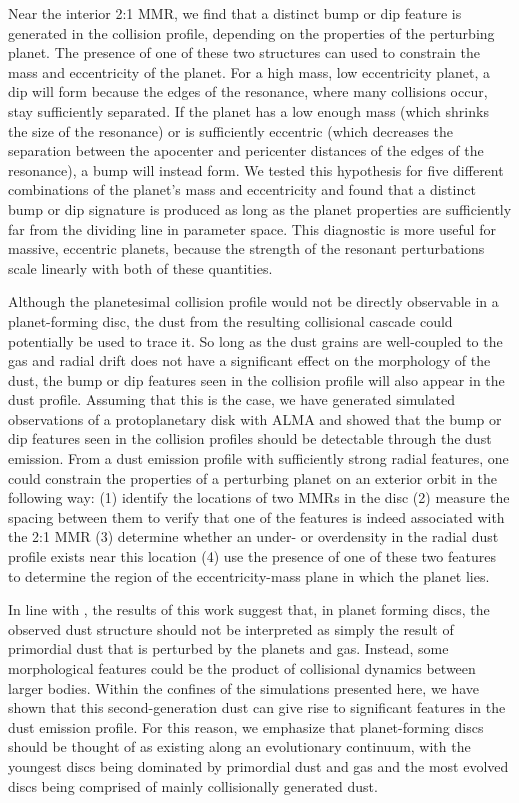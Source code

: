Near the interior 2:1 MMR, we find that a distinct bump or dip feature is generated in the collision profile, depending on the 
properties of the perturbing planet. The presence of one of these two structures can used to constrain the mass and eccentricity 
of the planet. For a high mass, low eccentricity planet, a dip will form because the edges of the resonance, where many 
collisions occur, stay sufficiently separated. If the planet has a low enough mass (which shrinks the size of the resonance) or is 
sufficiently eccentric (which decreases the separation between the apocenter and pericenter distances of the edges of the 
resonance), a bump will instead form. We tested this hypothesis for five different combinations of the planet's mass and 
eccentricity and found that a distinct bump or dip signature is produced as long as the planet properties are sufficiently far from 
the dividing line in parameter space. This diagnostic is more useful for massive, eccentric planets, because the strength of the 
resonant perturbations scale linearly with both of these quantities.

Although the planetesimal collision profile would not be directly observable in a planet-forming disc, the dust from the resulting 
collisional cascade could potentially be used to trace it. So long as the dust grains are well-coupled to the gas and radial drift 
does not have a significant effect on the morphology of the dust, the bump or dip features seen in the collision profile will also 
appear in the dust profile. Assuming that this is the case, we have generated simulated observations of a protoplanetary disk 
with ALMA and showed that the bump or dip features seen in the collision profiles should be detectable through the dust 
emission. From a dust emission profile with sufficiently strong radial features, one could constrain the properties of a perturbing 
planet on an exterior orbit in the following way: (1) identify the locations of two MMRs in the disc (2) measure the spacing 
between them to verify that one of the features is indeed associated with the 2:1 MMR (3) determine whether an under- or 
overdensity in the radial dust profile exists near this location (4) use the presence of one of these two features to determine the 
region of the eccentricity-mass plane in which the planet lies.

In line with \cite{boley17}, the results of this work suggest that, in planet forming discs, the observed dust structure should not be 
interpreted as simply the result of primordial dust that is perturbed by the planets and gas. Instead, some morphological features 
could be the product of collisional dynamics between larger bodies. Within the confines of the simulations presented here, we 
have shown that this second-generation dust can give rise to significant features in the dust emission profile. For this reason, we 
emphasize that planet-forming discs should be thought of as existing along an evolutionary continuum, with the youngest discs 
being dominated by primordial dust and gas and the most evolved discs being comprised of mainly collisionally generated dust.

